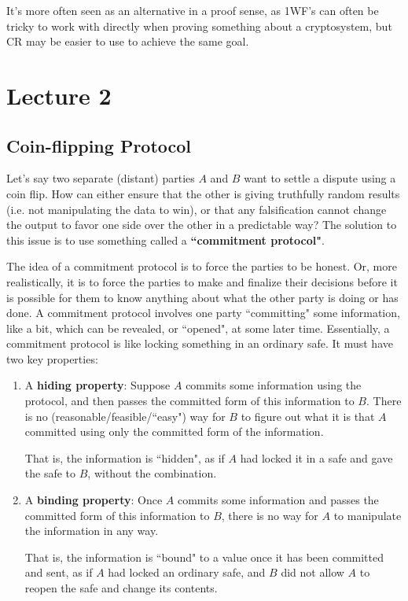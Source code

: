 \documentclass[11pt]{article}
\begin{document}
It's more often seen as an alternative in a proof sense, as 1WF's can often be tricky to work with directly when proving something about a cryptosystem, but CR may be easier to use to achieve the same goal.




\newpage
\section{Lecture 2}

\subsection{Coin-flipping Protocol}

Let's say two separate (distant) parties \(A\) and \(B\) want to settle a dispute using a coin flip. How can either ensure that the other is giving truthfully random results (i.e. not manipulating the data to win), or that any falsification cannot change the output to favor one side over the other in a predictable way? The solution to this issue is to use something called a \textbf{``commitment protocol"}.\medskip

The idea of a commitment protocol is to force the parties to be honest. Or, more realistically, it is to force the parties to make and finalize their decisions before it is possible for them to know anything about what the other party is doing or has done. A commitment protocol involves one party ``committing" some information, like a bit, which can be revealed, or ``opened", at some later time. Essentially, a commitment protocol is like locking something in an ordinary safe. It must have two key properties:

\begin{enumerate}
\item A \textbf{hiding property}: Suppose \(A\) commits some information using the protocol, and then passes the committed form of this information to \(B\). There is no (reasonable/feasible/``easy") way for \(B\) to figure out what it is that \(A\) committed using only the committed form of the information. 

That is, the information is ``hidden", as if \(A\) had locked it in a safe and gave the safe to \(B\), without the combination.
\item A \textbf{binding property}: Once \(A\) commits some information and passes the committed form of this information to \(B\), there is no way for \(A\) to manipulate the information in any way. 

That is, the information is ``bound" to a value once it has been committed and sent, as if \(A\) had locked an ordinary safe, and \(B\) did not allow \(A\) to reopen the safe and change its contents.
\end{enumerate}
\end{document}
